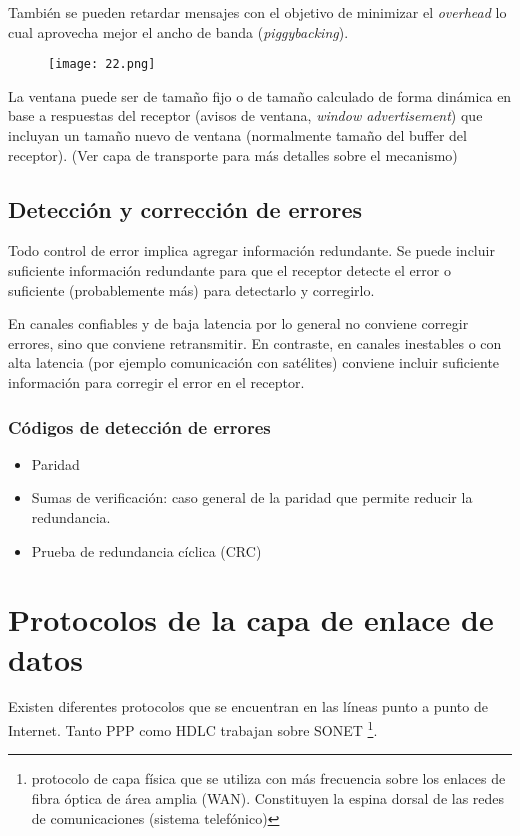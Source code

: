 \documentclass{book}
\begin{document}
	\vspace{3mm}
	También se pueden retardar mensajes con el objetivo de minimizar el \textit{overhead} lo cual aprovecha mejor el ancho de banda (\textit{piggybacking}).
	
	\begin{figure}[H]
		\centering
		\texttt{[image: 22.png]}
	\end{figure}
	
	La ventana puede ser de tamaño fijo o de tamaño calculado de forma dinámica en base a respuestas del receptor (avisos de ventana, \textit{window advertisement}) que incluyan un tamaño nuevo de ventana (normalmente tamaño del buffer del receptor). (Ver capa de transporte para más detalles sobre el mecanismo)
	
	\subsection{Detección y corrección de errores}
	Todo control de error implica agregar información redundante. Se puede incluir suficiente información redundante para que el receptor detecte el error o suficiente (probablemente más) para detectarlo y corregirlo.
	
	\vspace{3mm}
	En canales confiables y de baja latencia por lo general no conviene corregir errores, sino que conviene retransmitir. En contraste, en canales inestables o con alta latencia (por ejemplo comunicación con satélites) conviene incluir suficiente información para corregir el error en el receptor.
	
	\subsubsection{Códigos de detección de errores}
	\begin{itemize}
		\item Paridad
		\item Sumas de verificación: caso general de la paridad que permite reducir la redundancia.
		\item Prueba de redundancia cíclica (CRC)
	\end{itemize}
	
	\pagebreak
	\section{Protocolos de la capa de enlace de datos}
	Existen diferentes protocolos que se encuentran en las líneas punto a punto de Internet. Tanto PPP como HDLC trabajan sobre SONET \footnote{protocolo de capa física que se utiliza con más frecuencia sobre los enlaces de fibra óptica de área amplia (WAN). Constituyen la espina dorsal de las redes de comunicaciones (sistema telefónico)}.
	
\end{document}
